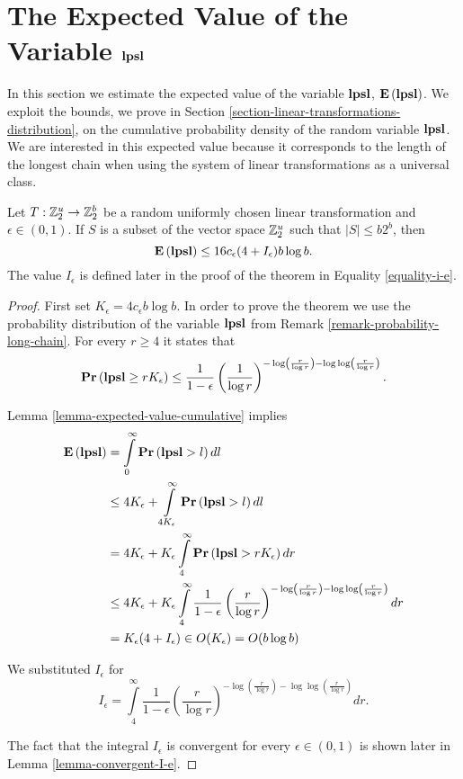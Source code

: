 \section{The Expected Value of the Variable $\mathbf{lpsl}$}
In this section we estimate the expected value of the variable $\mathbf{lpsl}$, $\mathbf{E}\left(\mathbf{lpsl}\right)$. We exploit the bounds, we prove in Section \ref{section-linear-transformations-distribution}, on the cumulative probability density of the random variable $\mathbf{lpsl}$. We are interested in this expected value because it corresponds to the length of the longest chain when using the system of linear transformations as a universal class.

\begin{theorem}
\label{theorem-n-logn-to-n}
Let $T: \mathbb{Z}_{2}^{u} \rightarrow \mathbb{Z}_{2}^{b}$ be a random uniformly chosen linear transformation and $\epsilon \in (0, 1)$. If $S$ is a subset of the vector space $\mathbb{Z}_{2}^{u}$ such that $|S| \leq b 2 ^ b$, then \[ \mathbf{E}\left(\mathbf{lpsl}\right) \leq 16 c_\epsilon(4 + I_\epsilon) b \log b \text{.} \] The value $I_\epsilon$ is defined later in the proof of the theorem in Equality \ref{equality-i-e}.
\end{theorem}
\begin{proof}
First set $K_\epsilon = 4 c_\epsilon b \log b$. In order to prove the theorem we use the probability distribution of the variable $\mathbf{lpsl}$ from Remark \ref{remark-probability-long-chain}. For every $r \geq 4$ it states that 
\[ 
\mathbf{Pr}\left(\mathbf{lpsl} \geq r K_\epsilon\right) \leq \frac{1}{1 - \epsilon}\left(\frac{1}{\log r}\right) ^ {-\log\left(\frac{r}{\log r}\right) - \log \log \left(\frac{r}{\log r}\right)} \text{.} 
\]

Lemma \ref{lemma-expected-value-cumulative} implies 
\[
\begin{split}
\mathbf{E}\left(\mathbf{lpsl}\right)
	& = \int\limits_0^{\infty} \mathbf{Pr}\left(\mathbf{lpsl} > l\right) dl \\
	& \leq 4K_\epsilon + \int\limits_{4K_\epsilon}^\infty \mathbf{Pr}\left(\mathbf{lpsl} > l\right) dl \\
	& = 4K_\epsilon + K_\epsilon \int\limits_4^\infty \mathbf{Pr}\left(\mathbf{lpsl} > rK_\epsilon\right) dr \\
	& \leq 4K_\epsilon + K_\epsilon \int\limits_4^\infty \frac{1}{1 - \epsilon} \left(\frac{r}{\log r}\right)^{-\log \left(\frac{r}{\log r}\right) - \log \log \left(\frac{r}{\log r}\right)} dr \\
	& = K_\epsilon(4 + I_\epsilon) \in O(K_\epsilon) = O(b \log b)
\end{split}
\]

We substituted $I_\epsilon$ for
\begin{equation}
\label{equality-i-e}
I_\epsilon = \int\limits_4^\infty \frac{1}{1 - \epsilon} \left(\frac{r}{\log r}\right)^{-\log \left(\frac{r}{\log r}\right) - \log \log \left(\frac{r}{\log r}\right)} dr \text{.}
\end{equation}

The fact that the integral $I_\epsilon$ is convergent for every $\epsilon \in (0, 1)$ is shown later in Lemma \ref{lemma-convergent-I-e}.
\end{proof}

